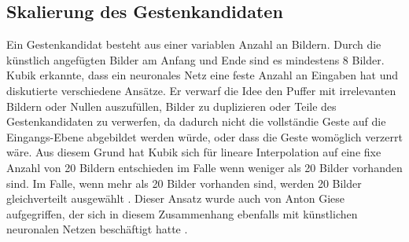 \subsection{Skalierung des Gestenkandidaten}
Ein Gestenkandidat besteht aus einer variablen Anzahl an Bildern. Durch die künstlich angefügten Bilder am Anfang und Ende sind es mindestens 8 Bilder. Kubik erkannte, dass ein neuronales Netz eine feste Anzahl an
Eingaben hat und diskutierte verschiedene Ansätze. Er verwarf die Idee den Puffer mit irrelevanten Bildern oder Nullen auszufüllen, Bilder zu duplizieren oder Teile des Gestenkandidaten zu verwerfen, da dadurch
nicht die vollständie Geste auf die Eingangs-Ebene abgebildet werden würde, oder dass die Geste womöglich verzerrt wäre. Aus diesem Grund hat Kubik sich für lineare Interpolation auf eine fixe Anzahl von 20 Bildern
entschieden im Falle wenn weniger als 20 Bilder vorhanden sind. Im Falle, wenn mehr als 20 Bilder vorhanden sind, werden 20 Bilder gleichverteilt ausgewählt \cite{kubikThesis}.
Dieser Ansatz wurde auch von Anton Giese aufgegriffen, der sich in diesem Zusammenhang ebenfalls mit künstlichen neuronalen Netzen beschäftigt hatte \cite{gieseThesis}.